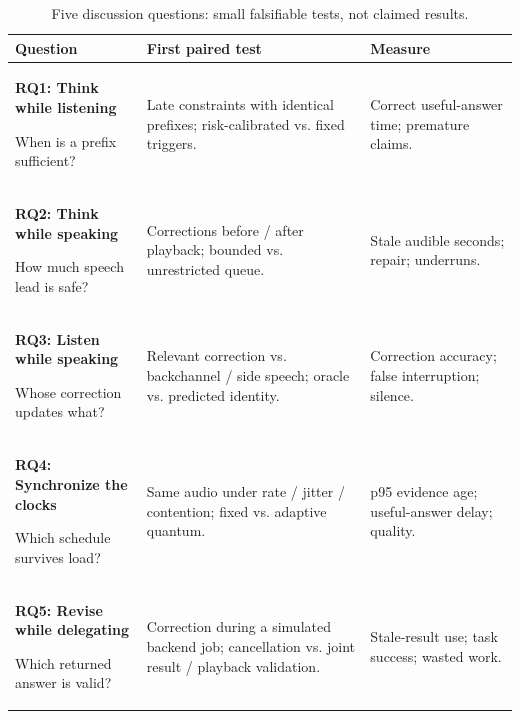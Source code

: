 \begin{table}[H]
\centering\small
\setlength{\tabcolsep}{4pt}
\setlength{\tablewidth}{\dimexpr\linewidth-4\tabcolsep\relax}
\renewcommand{\arraystretch}{1.06}
\caption{Five discussion questions: small falsifiable tests, not claimed results.}
\label{tab:questions}
\begin{tabular}{@{}>{\raggedright\arraybackslash}p{0.32\tablewidth}>{\raggedright\arraybackslash}p{0.43\tablewidth}>{\raggedright\arraybackslash}p{0.25\tablewidth}@{}}
\toprule
\textbf{Question} & \textbf{First paired test} & \textbf{Measure} \\
\midrule
\textbf{RQ1: Think while listening}\par When is a prefix sufficient? & Late constraints with identical prefixes; risk-calibrated vs. fixed triggers. & Correct useful-answer time; premature claims. \\
\addlinespace[2pt]
\textbf{RQ2: Think while speaking}\par How much speech lead is safe? & Corrections before / after playback; bounded vs. unrestricted queue. & Stale audible seconds; repair; underruns. \\
\addlinespace[2pt]
\textbf{RQ3: Listen while speaking}\par Whose correction updates what? & Relevant correction vs. backchannel / side speech; oracle vs. predicted identity. & Correction accuracy; false interruption; silence. \\
\addlinespace[2pt]
\textbf{RQ4: Synchronize the clocks}\par Which schedule survives load? & Same audio under rate / jitter / contention; fixed vs. adaptive quantum. & p95 evidence age; useful-answer delay; quality. \\
\addlinespace[2pt]
\textbf{RQ5: Revise while delegating}\par Which returned answer is valid? & Correction during a simulated backend job; cancellation vs. joint result / playback validation. & Stale-result use; task success; wasted work. \\
\bottomrule
\end{tabular}
\end{table}
